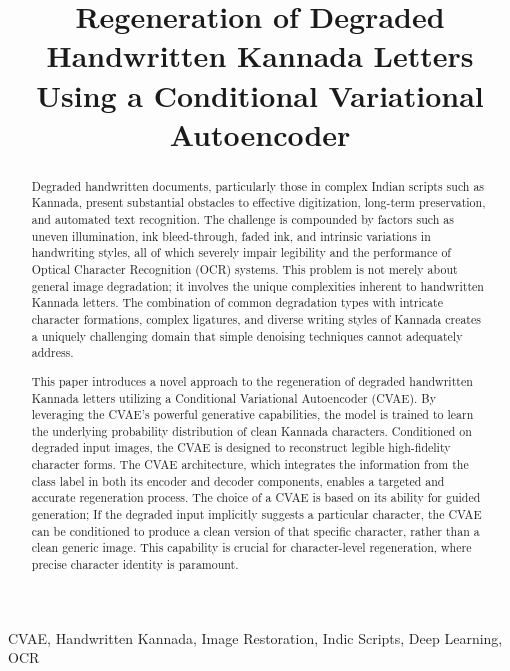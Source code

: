 \documentclass[conference]{IEEEtran}
\title{Regeneration of Degraded Handwritten Kannada Letters Using a Conditional Variational Autoencoder}
\author{\IEEEauthorblockN{Karan M}
\IEEEauthorblockA{\textit{CSE-AIML} \\
\textit{PES University}\\  Bangalore,  India \\
karanm6505@gmail.com\\
}
}
\begin{document}
\maketitle

\begin{abstract}
\justify
Degraded handwritten documents, particularly those in complex Indian scripts such as Kannada, present substantial obstacles to effective digitization, long-term preservation, and automated text recognition. The challenge is compounded by factors such as uneven illumination, ink bleed-through, faded ink, and intrinsic variations in handwriting styles, all of which severely impair legibility and the performance of Optical Character Recognition (OCR) systems.\cite{Davis2020, Emuru2023, Bhunia2023, Ahmed2024} This problem is not merely about general image degradation; it involves the unique complexities inherent to handwritten Kannada letters. The combination of common degradation types with intricate character formations, complex ligatures, and diverse writing styles of Kannada creates a uniquely challenging domain that simple denoising techniques cannot adequately address.

This paper introduces a novel approach to the regeneration of degraded handwritten Kannada letters utilizing a Conditional Variational Autoencoder (CVAE). By leveraging the CVAE's powerful generative capabilities, the model is trained to learn the underlying probability distribution of clean Kannada characters. Conditioned on degraded input images, the CVAE is designed to reconstruct legible high-fidelity character forms. The CVAE architecture, which integrates the information from the class label in both its encoder and decoder components, enables a targeted and accurate regeneration process.\cite{Kumar2020, Graves2013} The choice of a CVAE is based on its ability for guided generation; If the degraded input implicitly suggests a particular character, the CVAE can be conditioned to produce a clean version of that specific character, rather than a clean generic image. This capability is crucial for character-level regeneration, where precise character identity is paramount.
\end{abstract}

\begin{IEEEkeywords}
CVAE, Handwritten Kannada, Image Restoration, Indic Scripts, Deep Learning, OCR
\end{IEEEkeywords}

\maketitle
\end{document}
